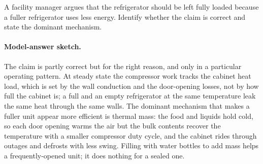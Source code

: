 \begin{exercise}
A facility manager argues that the refrigerator should be left fully
loaded because a fuller refrigerator uses less energy. Identify
whether the claim is correct and state the dominant mechanism.
\paragraph{Model-answer sketch.} The claim is partly correct but for
the right reason, and only in a particular operating pattern. At steady
state the compressor work tracks the cabinet heat load, which is set by
the wall conduction and the door-opening losses, not by how full the
cabinet is; a full and an empty refrigerator at the same temperature
leak the same heat through the same walls. The dominant mechanism that
makes a fuller unit appear more efficient is thermal mass: the food and
liquids hold cold, so each door opening warms the air but the bulk
contents recover the temperature with a smaller compressor duty cycle,
and the cabinet rides through outages and defrosts with less swing.
Filling with water bottles to add mass helps a frequently-opened unit;
it does nothing for a sealed one.
\end{exercise}
